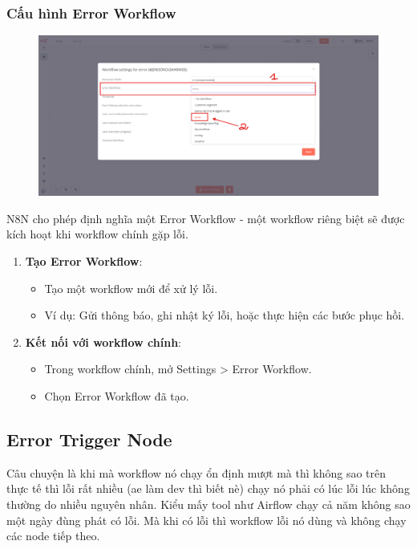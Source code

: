 \newpage

\subsubsection{Cấu hình Error Workflow}
\begin{figure}[htbp]
    \centering
    \includegraphics[width=1\linewidth]{Chap1-7/setting_error.pdf}
\end{figure}

N8N cho phép định nghĩa một Error Workflow - một workflow riêng biệt sẽ được kích hoạt khi workflow chính gặp lỗi.

\begin{enumerate}
  \item \textbf{Tạo Error Workflow}:
  \begin{itemize}
    \item Tạo một workflow mới để xử lý lỗi.
    \item Ví dụ: Gửi thông báo, ghi nhật ký lỗi, hoặc thực hiện các bước phục hồi.
  \end{itemize}

  \item \textbf{Kết nối với workflow chính}:
  \begin{itemize}
    \item Trong workflow chính, mở Settings > Error Workflow.
    \item Chọn Error Workflow đã tạo.
  \end{itemize}
\end{enumerate}

\subsection{Error Trigger Node}

Câu chuyện là khi mà workflow nó chạy ổn định mượt mà thì không sao trên thực tế thì lỗi rất nhiều (ae làm dev thì biết nè) chạy nó phải có lúc lỗi lúc không thường do nhiều nguyên nhân. Kiểu mấy tool như Airflow chạy cả năm không sao một ngày đùng phát có lỗi. Mà khi có lỗi thì workflow lỗi nó dùng và không chạy các node tiếp theo. 

